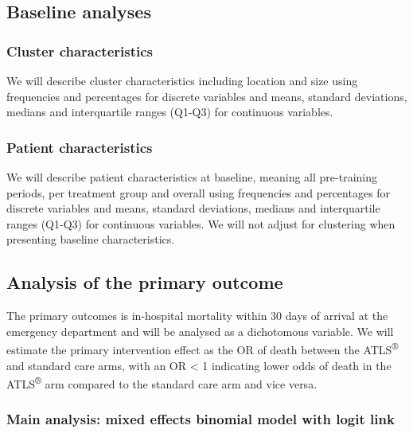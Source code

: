 \documentclass[
]{scrartcl}
\begin{document}
\hypertarget{baseline-analyses}{%
\subsection{Baseline analyses}\label{baseline-analyses}}

\hypertarget{cluster-characteristics}{%
\subsubsection{Cluster characteristics}\label{cluster-characteristics}}

We will describe cluster characteristics including location and size
using frequencies and percentages for discrete variables and means,
standard deviations, medians and interquartile ranges (Q1-Q3) for
continuous variables.

\hypertarget{patient-characteristics}{%
\subsubsection{Patient characteristics}\label{patient-characteristics}}

We will describe patient characteristics at baseline, meaning all
pre-training periods, per treatment group and overall using frequencies
and percentages for discrete variables and means, standard deviations,
medians and interquartile ranges (Q1-Q3) for continuous variables. We
will not adjust for clustering when presenting baseline characteristics.

\hypertarget{analysis-of-the-primary-outcome}{%
\subsection{Analysis of the primary
outcome}\label{analysis-of-the-primary-outcome}}

The primary outcomes is in-hospital mortality within 30 days of arrival
at the emergency department and will be analysed as a dichotomous
variable. We will estimate the primary intervention effect as the OR of
death between the ATLS\textsuperscript{®} and standard care arms, with
an OR \textless{} 1 indicating lower odds of death in the
ATLS\textsuperscript{®} arm compared to the standard care arm and vice
versa.

\hypertarget{main-analysis-mixed-effects-binomial-model-with-logit-link}{%
\subsubsection{Main analysis: mixed effects binomial model with logit
link}\label{main-analysis-mixed-effects-binomial-model-with-logit-link}}
\end{document}
